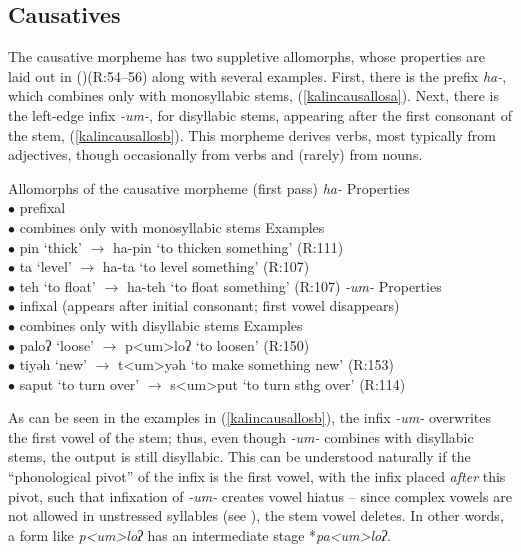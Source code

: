 \documentclass[output=paper]{langscibook}
\newcounter{nexttmp}    %
\newcommand{\Next}{\setcounter{nexttmp}{\value{equation}}\stepcounter{nexttmp}(\thenexttmp)\xspace}
\begin{document}
\subsection{Causatives}\label{sec:kalin:3.1}

The causative morpheme has two suppletive allomorphs, whose properties are laid out in \Next (R:54--56) along with several examples. First, there is the prefix  \textit{ha-}, which combines only with monosyllabic stems, (\ref{kalincausallosa}). Next, there is the left-edge infix \textit{-um-}, for disyllabic stems, appearing after the first consonant of the stem, (\ref{kalincausallosb}). This morpheme derives verbs, most typically from adjectives, though occasionally from verbs and (rarely) from nouns.

\ea Allomorphs of the causative morpheme (first pass) \label{kalincausallos}
\ea \textit{ha-}\label{kalincausallosa}
\ea  Properties\\
$\bullet$ prefixal\\
$\bullet$ combines only with monosyllabic stems
\ex Examples\\
$\bullet$ pin `thick' $\rightarrow$ ha-pin `to thicken something' \hfill (R:111)\\
$\bullet$ ta `level' $\rightarrow$ ha-ta `to level something' \hfill (R:107)\\
$\bullet$ teh `to float' $\rightarrow$ ha-teh `to float something' \hfill (R:107)
\z
\ex \textit{-um-} \label{kalincausallosb}
\ea Properties\\
$\bullet$ infixal (appears after initial consonant; first vowel disappears)\\
$\bullet$ combines only with disyllabic stems
\ex Examples\\
$\bullet$ paloʔ `loose' $\rightarrow$ p<um>loʔ `to loosen' \hfill (R:150)\\
$\bullet$ tiyəh `new' $\rightarrow$ t<um>yəh `to make something new' \hfill (R:153)\\
$\bullet$ saput `to turn over' $\rightarrow$ s<um>put `to turn sthg over' \hfill (R:114)
\z
\z
\z

As can be seen in the examples in (\ref{kalincausallosb}), the infix \textit{-um-} overwrites the first vowel of the stem; thus, even though \textit{-um-} combines with disyllabic stems, the output is still disyllabic. This can be understood naturally if the ``phonological pivot'' \citep{Yu07} of the infix is the first vowel, with the infix placed {\it after} this pivot, such that infixation of \textit{-um-} creates vowel hiatus -- since complex vowels are not allowed in unstressed syllables (see ), the stem vowel deletes. In other words, a form like \textit{p<um>loʔ} has an intermediate stage *\textit{pa<um>loʔ}.
\end{document}
